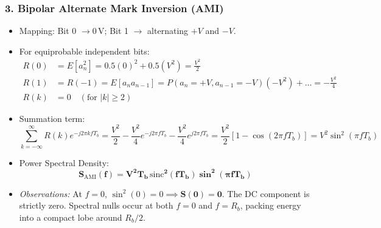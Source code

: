 \documentclass[11pt,a4paper]{article}
\begin{document}
\subsubsection{3. Bipolar Alternate Mark Inversion (AMI)}
\begin{itemize}
    \item Mapping: Bit 0 $\to 0\,\mathrm{V}$; Bit 1 $\to$ alternating $+V$ and $-V$.
    \item For equiprobable independent bits:
    \begin{align}
    R(0) &= E[a_n^2] = 0.5(0)^2 + 0.5(V^2) = \frac{V^2}{2} \\
    R(1) &= R(-1) = E[a_n a_{n-1}] = P(a_n = +V, a_{n-1} = -V)(-V^2) + \dots = -\frac{V^2}{4} \\
    R(k) &= 0 \quad (\text{for } |k| \ge 2)
    \end{align}
    \item Summation term:
    \begin{equation}
    \sum_{k=-\infty}^{\infty} R(k) e^{-j 2\pi k f T_b} = \frac{V^2}{2} - \frac{V^2}{4} e^{-j 2\pi f T_b} - \frac{V^2}{4} e^{j 2\pi f T_b} = \frac{V^2}{2} [1 - \cos(2\pi f T_b)] = V^2 \sin^2(\pi f T_b)
    \end{equation}
    \item Power Spectral Density:
    \begin{equation}
    \mathbf{S_{\mathrm{AMI}}(f) = V^2 T_b \,\mathrm{sinc}^2(f T_b) \sin^2(\pi f T_b)}
    \end{equation}
    \item \textit{Observations:} At $f = 0$, $\sin^2(0) = 0 \implies \mathbf{S(0) = 0}$. The DC component is strictly zero. Spectral nulls occur at both $f = 0$ and $f = R_b$, packing energy into a compact lobe around $R_b / 2$.
\end{itemize}
\end{document}
